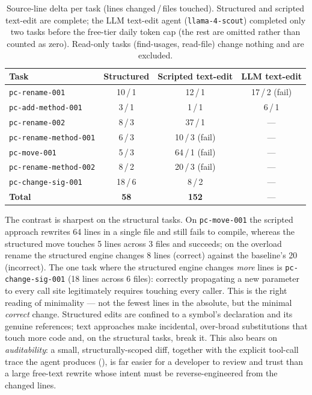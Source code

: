 \begin{table}[t]
  \centering
  \caption{Source-line delta per task (lines changed\,/\,files touched). Structured
  and scripted text-edit are complete; the LLM text-edit agent (\texttt{llama-4-scout})
  completed only two tasks before the free-tier daily token cap (the rest are omitted
  rather than counted as zero). Read-only tasks (find-usages, read-file) change
  nothing and are excluded.}
  \label{tab:diff}
  \begin{tabular}{@{}lccc@{}}
    \toprule
    Task & Structured & Scripted text-edit & LLM text-edit \\
    \midrule
    \texttt{pc-rename-001}        & 10\,/\,1 & 12\,/\,1            & 17\,/\,2 (fail) \\
    \texttt{pc-add-method-001}    & 3\,/\,1  & 1\,/\,1            & 6\,/\,1 \\
    \texttt{pc-rename-002}        & 8\,/\,3  & 37\,/\,1           & --- \\
    \texttt{pc-rename-method-001} & 6\,/\,3  & 10\,/\,3 (fail)    & --- \\
    \texttt{pc-move-001}          & 5\,/\,3  & 64\,/\,1 (fail)    & --- \\
    \texttt{pc-rename-method-002} & 8\,/\,2  & 20\,/\,3 (fail)    & --- \\
    \texttt{pc-change-sig-001}    & 18\,/\,6 & 8\,/\,2           & --- \\
    \midrule
    \textbf{Total} & \textbf{58} & \textbf{152} & --- \\
    \bottomrule
  \end{tabular}
\end{table}

The contrast is sharpest on the structural tasks. On \texttt{pc-move-001} the
scripted approach rewrites 64 lines in a single file and still fails to compile,
whereas the structured move touches 5 lines across 3 files and succeeds; on the
overload rename the structured engine changes 8 lines (correct) against the
baseline's 20 (incorrect). The one task where the structured engine changes
\emph{more} lines is \texttt{pc-change-sig-001} (18 lines across 6 files): correctly
propagating a new parameter to every call site legitimately requires touching every
caller. This is the right reading of minimality --- not the fewest lines in the
absolute, but the minimal \emph{correct} change. Structured edits are confined to a
symbol's declaration and its genuine references; text approaches make incidental,
over-broad substitutions that touch more code and, on the structural tasks, break
it. This also bears on \emph{auditability}: a small, structurally-scoped diff, together
with the explicit tool-call trace the agent produces (), is far easier
for a developer to review and trust than a large free-text rewrite whose intent must be
reverse-engineered from the changed lines.

